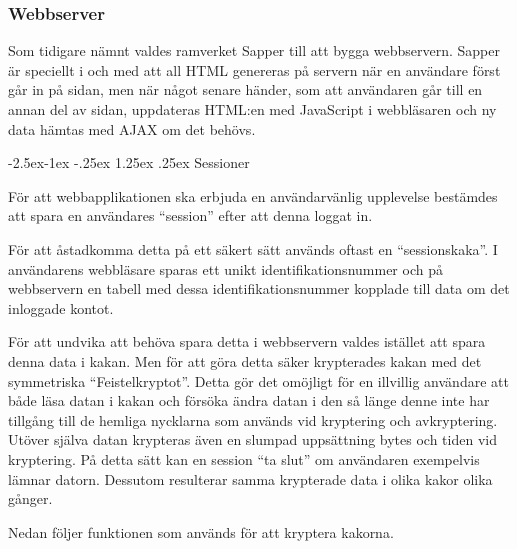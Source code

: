 \documentclass{article}
\makeatletter
\renewcommand\paragraph{\@startsection{paragraph}{4}{\z@}%
			{-2.5ex\@plus -1ex \@minus -.25ex}%
			{1.25ex \@plus .25ex}%
			{\normalfont\normalsize\bfseries}}
\makeatother
\begin{document}
\subsubsection{Webbserver}
\label{webbserver}


Som tidigare nämnt valdes ramverket Sapper till att bygga webbservern. Sapper är
speciellt i och med att all HTML genereras på servern när en användare först går
in på sidan, men när något senare händer, som att användaren går till en annan
del av sidan, uppdateras HTML:en med JavaScript i webbläsaren och ny data hämtas
med AJAX om det behövs.

\paragraph{Sessioner}

För att webbapplikationen ska erbjuda en användarvänlig upplevelse bestämdes att
spara en användares ``session'' efter att denna loggat in.

För att åstadkomma detta på ett säkert sätt används oftast en ``sessionskaka''.
I användarens webbläsare sparas ett unikt identifikationsnummer och på
webbservern en tabell med dessa identifikationsnummer kopplade till data om det
inloggade kontot.

För att undvika att behöva spara detta i webbservern valdes istället att spara
denna data i kakan. Men för att göra detta säker krypterades kakan med det
symmetriska ``Feistelkryptot''. Detta gör det omöjligt för en illvillig
användare att både läsa datan i kakan och försöka ändra datan i den så länge
denne inte har tillgång till de hemliga nycklarna som används vid kryptering och
avkryptering. Utöver själva datan krypteras även en slumpad uppsättning bytes
och tiden vid kryptering. På detta sätt kan en session ``ta slut'' om användaren
exempelvis lämnar datorn. Dessutom resulterar samma krypterade data i olika
kakor olika gånger.

Nedan följer funktionen som används för att kryptera kakorna.
\end{document}
